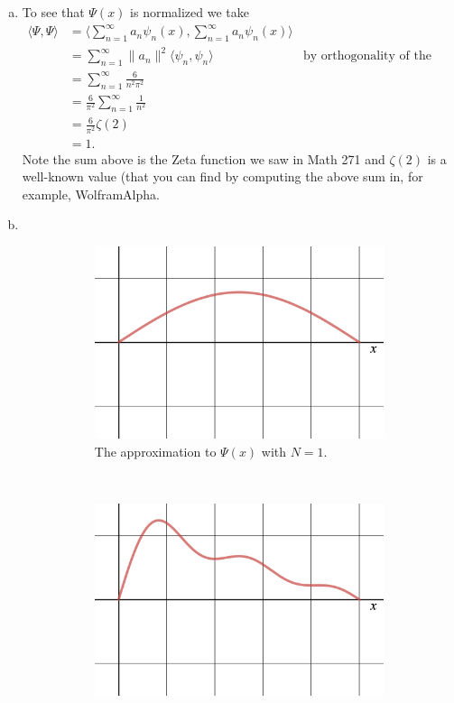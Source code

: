 \documentclass[12pt]{article} %
\newcommand{\innprod}[2]{\langle #1, #2 \rangle}
\begin{document}
\begin{solution}
	\begin{enumerate}[(a)]
		\item To see that $\Psi(x)$ is normalized we take
		\begin{align*}
			\innprod{\Psi}{\Psi} &= \innprod{\sum_{n=1}^\infty a_n \psi_n(x)}{\sum_{n=1}^\infty a_n \psi_n(x)}\\
			&= \sum_{n=1}^\infty \|a_n\|^2 \innprod{\psi_n}{\psi_n} &\textrm{by orthogonality of the states}\\
			&= \sum_{n=1}^\infty \frac{6}{n^2 \pi^2}\\
			&= \frac{6}{\pi^2} \sum_{n=1}^\infty \frac{1}{n^2}\\
			&= \frac{6}{\pi^2} \zeta(2)\\
			&= 1.
		\end{align*}
		Note the sum above is the Zeta function we saw in Math 271 and $\zeta(2)$ is a well-known value (that you can find by computing the above sum in, for example, WolframAlpha.
		\item ~
	\begin{figure}[H]
	\centering
		\begin{subfigure}[h]{0.48\textwidth}
			\centering
			\includegraphics[width=.8\textwidth]{n=1.png}
			\caption{The approximation to $\Psi(x)$ with $N=1$.}
		\end{subfigure}
		~
		\begin{subfigure}[h]{0.48\textwidth}
			\centering
			\includegraphics[width=.8\textwidth]{n=5.png}

\end{subfigure}
\end{figure}
\end{enumerate}
\end{solution}
\end{document}
